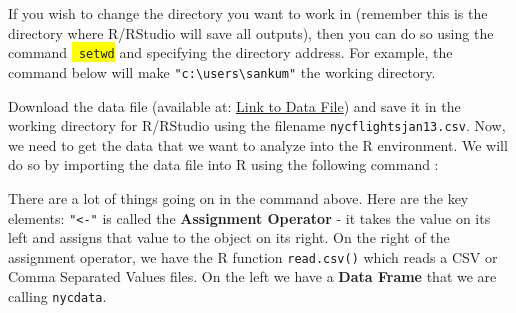 \documentclass[11pt, letterpaper, twoside]{memoir}\usepackage{knitr}
\newcommand\rcommand[1]{
\colorbox{yellow}{\texttt{\color{red} #1}}
\index{R Commands!#1}
}
\begin{document}
If you wish to change the directory you want to work in (remember this is the directory where R/RStudio will save all outputs), then you can do so using the command \rcommand{setwd} and specifying the directory address. For example, the command below will make \verb|"c:\users\sankum"| the working directory. 

\begin{knitrout}
\color{fgcolor}\begin{kframe}
\begin{alltt}
\end{alltt}
\end{kframe}
\end{knitrout}

Download the data file (available at: \href{https://umich.box.com/s/xtpp98qygojc0fh14vhlvdr6nzsa47a2}{Link to Data File}) and save it in the working directory for R/RStudio using the filename \texttt{nycflightsjan13.csv}. Now, we need to get the data that we want to analyze into the R environment. We will do so by importing the data file into R using the following command :

\begin{knitrout}
\color{fgcolor}\begin{kframe}
\begin{alltt}
 \hlkwb{<-} \hlstd{(}\hlstd{)}
\end{alltt}
\end{kframe}
\end{knitrout}

There are a lot of things going on in the command above. Here are the key elements: \texttt{"<-"} is called the \textbf{Assignment Operator} - it takes the value on its left and assigns that value to the object on its right. On the right of the assignment operator, we have the R function \texttt{read.csv()} which reads a CSV or Comma Separated Values files. On the left we have a \textbf{Data Frame} that we are calling \texttt{nycdata}. 
\end{document}
